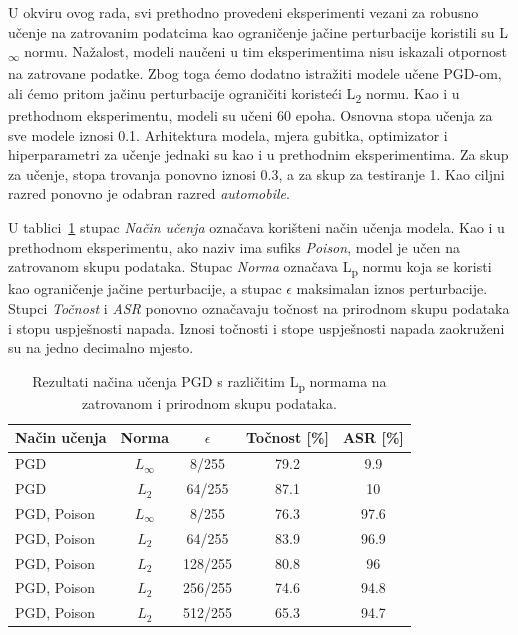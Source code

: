 \documentclass[times, utf8, zavrsni, numeric]{fer}
\begin{document}
\pagebreak

U okviru ovog rada, svi prethodno provedeni eksperimenti vezani za robusno učenje na zatrovanim podatcima kao ograničenje jačine perturbacije koristili su L\textsubscript{$\infty$} normu.
Nažalost, modeli naučeni u tim eksperimentima nisu iskazali otpornost na zatrovane podatke. 
Zbog toga ćemo dodatno istražiti modele učene PGD-om, ali ćemo pritom jačinu perturbacije ograničiti koristeći L\textsubscript{2} normu.
Kao i u prethodnom eksperimentu, modeli su učeni 60 epoha. Osnovna stopa učenja za sve modele iznosi 0.1. Arhitektura modela, mjera gubitka, optimizator i hiperparametri za učenje jednaki su kao i u prethodnim eksperimentima.
Za skup za učenje, stopa trovanja ponovno iznosi 0.3, a za skup za testiranje 1.
Kao ciljni razred ponovno je odabran razred \textit{automobile}.

U tablici~\ref{tbl:mjerenja_zatrovano_norme} stupac \textit{Način učenja} označava korišteni način učenja modela.
Kao i u prethodnom eksperimentu, ako naziv ima sufiks \textit{Poison}, model je učen na zatrovanom skupu podataka.
Stupac \textit{Norma} označava L\textsubscript{p} normu koja se koristi kao ograničenje jačine perturbacije, a stupac \textit{$\epsilon$} maksimalan iznos perturbacije.
Stupci \textit {Točnost} i \textit{ASR} ponovno označavaju točnost na prirodnom skupu podataka i stopu uspješnosti napada.
Iznosi točnosti i stope uspješnosti napada zaokruženi su na jedno decimalno mjesto.

\begin{table}[htb]
    \caption{Rezultati načina učenja PGD s različitim L\textsubscript{p} normama na zatrovanom i prirodnom skupu podataka.}
    \label{tbl:mjerenja_zatrovano_norme}
    \centering
    \begin{tabular}{lcccc} \hline
    Način učenja & Norma & $\epsilon$ & Točnost [\%] & ASR [\%]\\ \hline
    PGD & $L_\infty$ & 8/255 & 79.2 & 9.9 \\
    PGD & $L_2$ & 64/255 & 87.1 & 10 \\
    PGD, Poison & $L_\infty$ & 8/255 & 76.3 & 97.6 \\
    PGD, Poison & $L_2$ & 64/255 & 83.9 & 96.9 \\
    PGD, Poison & $L_2$ & 128/255 & 80.8 & 96 \\
    PGD, Poison & $L_2$ & 256/255 & 74.6 & 94.8 \\
    PGD, Poison & $L_2$ & 512/255 & 65.3 & 94.7 \\ \hline
    \end{tabular}
\end{table}
\end{document}
